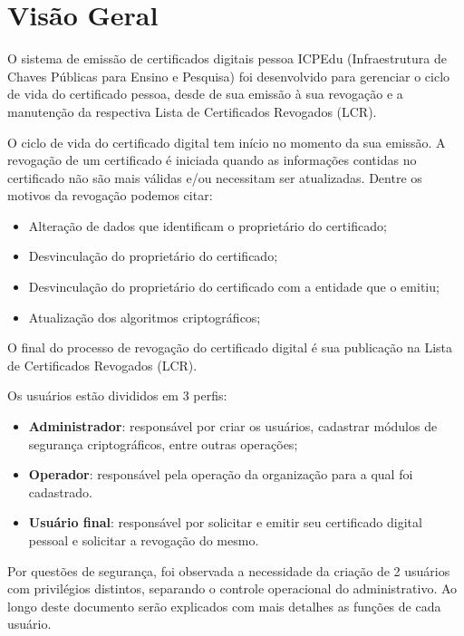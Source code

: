 \section{Visão Geral}

O sistema de emissão de certificados digitais pessoa ICPEdu (Infraestrutura de Chaves Públicas para Ensino e Pesquisa) foi desenvolvido para gerenciar o ciclo de vida do certificado pessoa, desde de sua emissão à sua revogação e a manutenção da respectiva Lista de Certificados Revogados (LCR).

O ciclo de vida do certificado digital tem início no momento da sua emissão. 
A revogação de um certificado é iniciada quando as informações contidas no certificado não são mais válidas e/ou necessitam ser atualizadas. Dentre os motivos da revogação podemos citar:

\begin{itemize}
  \item Alteração de dados que identificam o proprietário do certificado;
  \item Desvinculação do proprietário do certificado;
  \item Desvinculação do proprietário do certificado com a entidade que o emitiu;
  \item Atualização dos algoritmos criptográficos;
\end{itemize}

O final do processo de revogação do certificado digital é sua publicação na Lista de Certificados Revogados (LCR).

Os usuários estão divididos em 3 perfis:

\begin{itemize}
  \item \textbf{Administrador}: responsável por criar os usuários, cadastrar módulos de segurança criptográficos, entre outras operações;
  \item \textbf{Operador}: responsável pela operação da organização para a qual foi cadastrado.
  \item \textbf{Usuário final}: responsável por solicitar e emitir seu certificado digital pessoal e solicitar a revogação do mesmo.
\end{itemize}

Por questões de segurança, foi observada a necessidade da criação de 2 usuários com privilégios distintos, separando o controle operacional do administrativo. Ao longo deste documento serão explicados com mais detalhes as funções de cada usuário.

